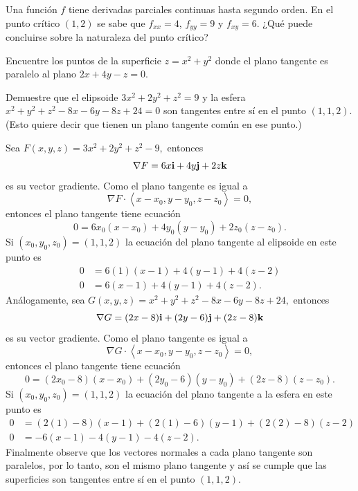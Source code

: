 \begin{prob}
Una función $f$ tiene derivadas parciales continuas hasta segundo orden.
En el punto crítico $(1,2)$ se sabe que $f_{xx}=4$, $f_{yy}=9$ y
$f_{xy}=6$. ¿Qué puede concluirse sobre la naturaleza del punto
crítico?
\end{prob}

\begin{prob}
Encuentre los puntos de la superficie $z = x^2 + y^2$ donde el plano
tangente es paralelo al plano $2x + 4y - z = 0$.
\end{prob}



\begin{prob}
Demuestre que el elipsoide $3x^2+2y^2+z^2=9$ y la esfera $x^2+y^2+z^2-8x-6y-8z+24=0$ son tangentes entre sí en el punto $(1,1,2)$. (Esto quiere decir que tienen un plano tangente común en ese punto.)
\begin{myproof}
Sea $F(x,y,z)=3x^2+2y^2+z^2-9,$ entonces $$\nabla F=6x{\bf i}+4y{\bf j}+2z{\bf k}$$ es su vector gradiente. Como el plano tangente es igual a $$\nabla F \cdot \left\langle x-x_0,y-y_0,z-z_0\right\rangle=0,$$ entonces el plano tangente tiene ecuación
$$ 0=6x_0(x-x_0)+4y_0(y-y_0)+2z_0(z-z_0).$$  
Si $(x_0,y_0,z_0)=(1,1,2)$ la ecuación del plano tangente al elipsoide en este punto es 
\begin{align*}
0&=6(1)(x-1)+4(y-1)+4(z-2)\\
0&=6(x-1)+4(y-1)+4(z-2).
\end{align*}
Análogamente, sea $G(x,y,z)=x^2+y^2+z^2-8x-6y-8z+24,$ entonces $$\nabla G=(2x-8){\bf i}+(2y-6){\bf j}+(2z-8){\bf k}$$ es su vector gradiente. Como el plano tangente es igual a $$\nabla G \cdot \left\langle x-x_0,y-y_0,z-z_0\right\rangle=0,$$ entonces el plano tangente tiene ecuación
$$ 0=(2x_0-8)(x-x_0)+(2y_0-6)(y-y_0)+(2z-8)(z-z_0).$$  
Si $(x_0,y_0,z_0)=(1,1,2)$ la ecuación del plano tangente a la esfera en este punto es 
\begin{align*}
0&=(2(1)-8)(x-1)+(2(1)-6)(y-1)+(2(2)-8)(z-2)\\
0&=-6(x-1)-4(y-1)-4(z-2).
\end{align*}
Finalmente observe que los vectores normales a cada plano tangente son paralelos, por lo tanto, son el mismo plano tangente y así se cumple que las superficies son tangentes entre sí en el punto $(1,1,2).$
\end{myproof}
\end{prob}

